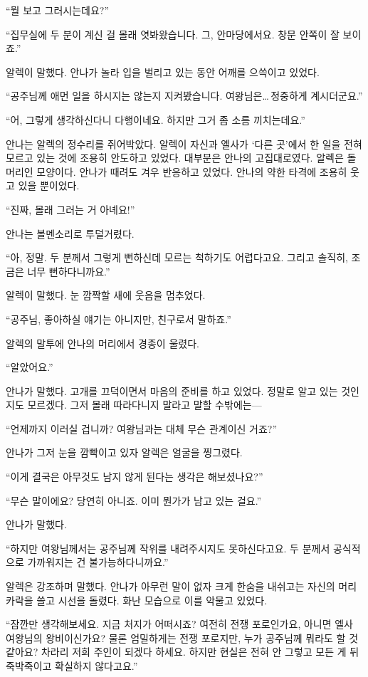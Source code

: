 ``뭘 보고 그러시는데요?''

``집무실에 두 분이 계신 걸 몰래 엿봐왔습니다. 그, 안마당에서요. 창문 안쪽이 잘 보이죠.''

알렉이 말했다. 안나가 놀라 입을 벌리고 있는 동안 어깨를 으쓱이고 있었다.

``공주님께 애먼 일을 하시지는 않는지 지켜봤습니다. 여왕님은\ldots\,정중하게 계시더군요.''

``어, 그렇게 생각하신다니 다행이네요. 하지만 그거 좀 소름 끼치는데요.''

안나는 알렉의 정수리를 쥐어박았다. 알렉이 자신과 엘사가 `다른 곳'에서 한 일을 전혀 모르고 있는 것에 조용히 안도하고 있었다. 대부분은 안나의 고집대로였다. 알렉은 돌머리인 모양이다. 안나가 때려도 겨우 반응하고 있었다. 안나의 약한 타격에 조용히 웃고 있을 뿐이었다.

``진짜, 몰래 그러는 거 아녜요!''

안나는 볼멘소리로 투덜거렸다.

``아, 정말. 두 분께서 그렇게 뻔하신데 모르는 척하기도 어렵다고요. 그리고 솔직히, 조금은 너무 뻔하다니까요.''

알렉이 말했다. 눈 깜짝할 새에 웃음을 멈추었다.

``공주님, 좋아하실 얘기는 아니지만, 친구로서 말하죠.''

알렉의 말투에 안나의 머리에서 경종이 울렸다.

``알았어요.''

안나가 말했다. 고개를 끄덕이면서 마음의 준비를 하고 있었다. 정말로 알고 있는 것인지도 모르겠다. 그저 몰래 따라다니지 말라고 말할 수밖에는—

``언제까지 이러실 겁니까? 여왕님과는 대체 무슨 관계이신 거죠?''

안나가 그저 눈을 깜빡이고 있자 알렉은 얼굴을 찡그렸다.

``이게 결국은 아무것도 남지 않게 된다는 생각은 해보셨나요?''

``무슨 말이에요? 당연히 아니죠. 이미 뭔가가 남고 있는 걸요.''

안나가 말했다.

``하지만 여왕님께서는 공주님께 작위를 내려주시지도 못하신다고요. 두 분께서 공식적으로 가까워지는 건 불가능하다니까요.''

알렉은 강조하며 말했다. 안나가 아무런 말이 없자 크게 한숨을 내쉬고는 자신의 머리카락을 쓸고 시선을 돌렸다. 화난 모습으로 이를 악물고 있었다.

``잠깐만 생각해보세요. 지금 처지가 어떠시죠? 여전히 전쟁 포로인가요, 아니면 엘사 여왕님의 왕비이신가요? 물론 엄밀하게는 전쟁 포로지만, 누가 공주님께 뭐라도 할 것 같아요? 차라리 저희 주인이 되겠다 하세요. 하지만 현실은 전혀 안 그렇고 모든 게 뒤죽박죽이고 확실하지 않다고요.''

